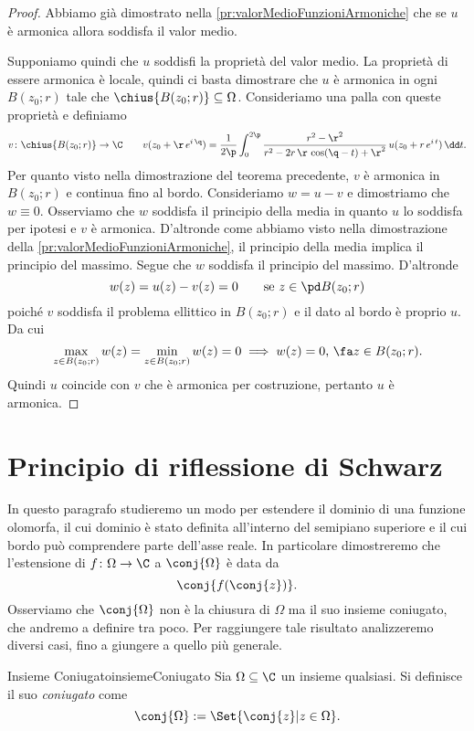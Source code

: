 \begin{proof}
	Abbiamo già dimostrato nella \autoref{pr:valorMedioFunzioniArmoniche} che se \(u\) è armonica allora soddisfa il valor medio.
	
	Supponiamo quindi che \(u\) soddisfi la proprietà del valor medio. La proprietà di essere armonica è locale, quindi ci basta dimostrare che \(u\) è armonica in ogni \(B(z_0;r)\) tale che \(\chius{B(z_0;r)}\subseteq \Omega\).
	Consideriamo una palla con queste proprietà e definiamo
	\[
		v\colon \chius{B(z_0;r)} \to \C \qquad v(z_0+\r\,e^{i\,\q}) = \frac{1}{2\p} \int_0^{2\p} \frac{r^2-\r^2}{r^2-2r\,\r\,\cos(\q-t)+\r^2}\,u(z_0+r\,e^{i\,t})\,\dd t.
	\]
	Per quanto visto nella dimostrazione del teorema precedente, \(v\) è armonica in \(B(z_0;r)\) e continua fino al bordo.
	Consideriamo \(w=u-v\) e dimostriamo che \(w\equiv 0\). Osserviamo che \(w\) soddisfa il principio della media in quanto \(u\) lo soddisfa per ipotesi e \(v\) è armonica. D'altronde come abbiamo visto nella dimostrazione della \autoref{pr:valorMedioFunzioniArmoniche}, il principio della media implica il principio del massimo.
	Segue che \(w\) soddisfa il principio del massimo. D'altronde
	\[
		w(z) = u(z)-v(z) = 0 \qquad\text{se }z\in \pd B(z_0;r)
	\]
	poiché \(v\) soddisfa il problema ellittico in \(B(z_0;r)\) e il dato al bordo è proprio \(u\). Da cui
	\[
		\max_{z\in B(z_0;r)} w(z) = \min_{z\in B(z_0;r)} w(z) = 0 \implies w(z) = 0,\,\fa z\in B(z_0;r).
	\]
	Quindi \(u\) coincide con \(v\) che è armonica per costruzione, pertanto \(u\) è armonica.
\end{proof}
\section{Principio di riflessione di Schwarz}

In questo paragrafo studieremo un modo per estendere il dominio di una funzione olomorfa, il cui dominio è stato definita all'interno del semipiano superiore e il cui bordo può comprendere parte dell'asse reale. In particolare dimostreremo che l'estensione di \(f\colon \Omega \to \C\) a \(\conj{\Omega}\) è data da
\[
	\conj{f(\conj{z})}.
\]
Osserviamo che \(\conj{\Omega}\) non è la chiusura di \(\Omega\) ma il suo insieme coniugato, che andremo a definire tra poco.
Per raggiungere tale risultato analizzeremo diversi casi, fino a giungere a quello più generale.

\begin{defn}{Insieme Coniugato}{insiemeConiugato}
	Sia \(\Omega\subseteq \C\) un insieme qualsiasi. Si definisce il suo \emph{coniugato} come
	\[
		\conj{\Omega} := \Set{\conj{z} | z \in \Omega}.
	\]
\end{defn}

